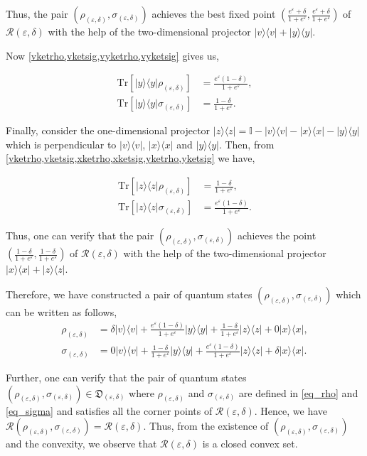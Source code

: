 \documentclass[onecolumn,ldraftcls, 11pt]{IEEEtran}
\newcommand{\tr}{\mathrm{Tr}}
\newcommand{\ketbra}[1]{|#1\rangle\langle#1|}
\newcommand{\eps}{\varepsilon}
\newcommand*{\bbI}{\mathbb{I}}
\newcommand*{\cR}{\mathcal{R}}
\begin{document}
Thus, the pair $(\rho_{(\eps,\delta)},\sigma_{(\eps,\delta)})$ achieves the best fixed point $(\frac{e^\eps + \delta}{1+e^\eps}, \frac{e^\eps + \delta}{1+e^\eps})$ of $\cR(\eps,\delta)$ with the help of the two-dimensional projector $\ketbra{v} + \ketbra{y}$.

Now \cref{vketrho,vketsig,vyketrho,vyketsig} gives us,

\begin{align}
    \tr[\ketbra{y}\rho_{(\eps,\delta)}] &= \frac{e^\eps(1-\delta)}{1+e^\eps}, \label{yketrho}\\
\tr[\ketbra{y}\sigma_{(\eps,\delta)}] &= \frac{1-\delta}{1+e^\eps}.\label{yketsig}
\end{align}

Finally, consider the one-dimensional projector $\ketbra{z} = \bbI - \ketbra{v} - \ketbra{x} - \ketbra{y}$ which is perpendicular to $\ketbra{v}$, $\ketbra{x}$ and $\ketbra{y}$. Then, from \cref{vketrho,vketsig,xketrho,xketsig,yketrho,yketsig} we have,

\begin{align}
    \tr[\ketbra{z}\rho_{(\eps,\delta)}] &= \frac{1-\delta}{1+e^\eps}, \label{zketrho}\\
\tr[\ketbra{z}\sigma_{(\eps,\delta)}] &= \frac{e^\eps(1-\delta)}{1+e^\eps}.\label{zketsig}
\end{align}


Thus, one can verify that the pair $(\rho_{(\eps,\delta)},\sigma_{(\eps,\delta)})$ achieves the point $(\frac{1-\delta}{1+e^\eps},\frac{1-\delta}{1+e^\eps})$ of $\cR(\eps,\delta)$ with the help of the two-dimensional projector $\ketbra{x} + \ketbra{z}$.

Therefore, we have constructed a pair of quantum states $(\rho_{(\eps,\delta)},\sigma_{(\eps,\delta)})$ which can be written as follows,
\begin{align}
    \rho_{(\eps,\delta)} & = \delta \ketbra{v} + \frac{e^\eps(1-\delta)}{1+e^\eps} \ketbra{y} + \frac{1-\delta}{1+e^\eps} \ketbra{z} + 0 \ketbra{x},\label{eq_rho} \\
    \sigma_{(\eps,\delta)} & = 0 \ketbra{v}+ \frac{1-\delta}{1+e^\eps} \ketbra{y} + \frac{e^\eps(1-\delta)}{1+e^\eps} \ketbra{z} + \delta \ketbra{x}.\label{eq_sigma}
\end{align}

Further, one can verify that the pair of quantum states $(\rho_{(\eps,\delta)},\sigma_{(\eps,\delta)}) \in \mathfrak{D}_{(\eps,\delta)}$ where $\rho_{(\eps,\delta)}$ and $\sigma_{(\eps,\delta)}$ are defined in \eqref{eq_rho} and \eqref{eq_sigma} and satisfies all the corner points of $\cR(\eps,\delta)$. 
Hence, we have $\cR(\rho_{(\eps,\delta)},\sigma_{(\eps,\delta)}) = \cR(\eps,\delta)$. Thus, from the existence of $(\rho_{(\eps,\delta)},\sigma_{(\eps,\delta)})$ and the convexity, we observe that $\cR(\eps,\delta)$ is a closed convex set.
\end{document}

